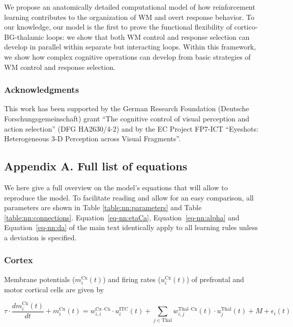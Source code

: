 \documentclass[
  11pt,
  a4paper,
]{scrbook}
\begin{document}
We propose an anatomically detailed computational model of how
reinforcement learning contributes to the organization of WM and overt
response behavior. To our knowledge, our model is the first to prove the
functional flexibility of cortico-BG-thalamic loops: we show that both
WM control and response selection can develop in parallel within
separate but interacting loops. Within this framework, we show how
complex cognitive operations can develop from basic strategies of WM
control and response selection.

\subsubsection*{Acknowledgments}\label{acknowledgments-1}

This work has been supported by the German Research Foundation (Deutsche
Forschungsgemeinschaft) grant ``The cognitive control of visual
perception and action selection'' (DFG HA2630/4-2) and by the EC Project
FP7-ICT ``Eyeshots: Heterogeneous 3-D Perception across Visual
Fragments''.

\subsection*{Appendix A. Full list of
equations}\label{appendix-a.-full-list-of-equations}

We here give a full overview on the model's equations that will allow to
reproduce the model. To facilitate reading and allow for an easy
comparison, all parameters are shown in Table \ref{table:nn:parameters}
and Table \ref{table:nn:connections}. Equation~\ref{eq-nn:etaCa},
Equation~\ref{eq-nn:alpha} and Equation~\ref{eq-nn:da} of the main text
identically apply to all learning rules unless a deviation is specified.

\subsubsection*{Cortex}\label{cortex-1}

Membrane potentials (\(m_i^\text{Cx}(t)\)) and firing rates
(\(u_i^\text{Cx}(t)\)) of prefrontal and motor cortical cells are given
by

\[
    \tau \cdot \frac{d m_i^\text{Cx}(t)}{dt} + m_i^\text{Cx}(t) = w_{i,i}^\text{Cx–Cx} \cdot u_i^\text{ITC}(t) + \sum_{j \in \text{Thal}} w_{i,j}^\text{Thal–Cx}(t) \cdot u_j^\text{Thal}(t) + M + \epsilon_i(t)
\]
\end{document}
